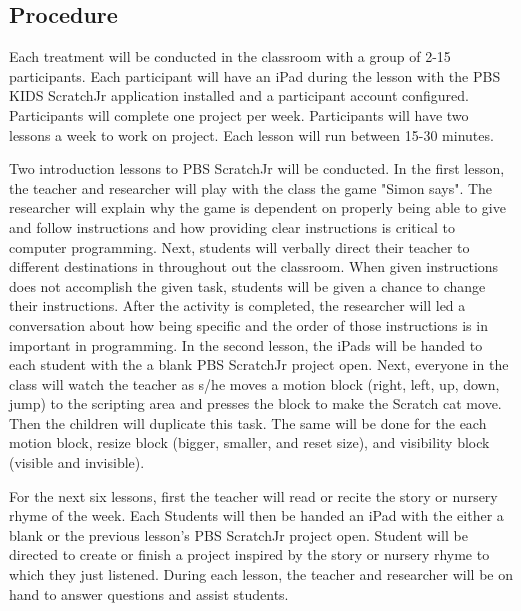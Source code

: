 \documentclass[11pt, letterpaper, onecolumn]{article}
\begin{document}
\subsection{Procedure}

Each treatment will be conducted in the classroom with a group of 2-15 participants. 
%
Each participant will have an iPad during the lesson with the PBS KIDS ScratchJr application installed and a participant account configured.
%
Participants will complete one project per week. 
%
Participants will have two lessons a week to work on project. 
%
Each lesson will run between 15-30 minutes. 

Two introduction lessons to PBS ScratchJr will be conducted. 
%
In the first lesson, the teacher and researcher will play with the class the game "Simon says".
%
The researcher will explain why the game is dependent on properly being able to give and follow instructions and how providing clear instructions is critical to computer programming. 
%
Next, students will verbally direct their teacher to different destinations in throughout out the classroom. 
%
When given instructions does not accomplish the given task, students will be given a chance to change their instructions. 
%
After the activity is completed, the researcher will led a conversation about how being specific and the order of those instructions is in important in programming.
%
In the second lesson, the iPads will be handed to each student with the a blank PBS ScratchJr project open. 
%
Next, everyone in the class will watch the teacher as s/he moves a motion block (right, left, up, down, jump) to the scripting area and presses the block to make the Scratch cat move. 
%
Then the children will duplicate this task. 
%
The same will be done for the each motion block, resize block (bigger, smaller, and reset size), and visibility block (visible and invisible).
%

%
For the next six lessons, first the teacher will read or recite the story or nursery rhyme of the week. 
%
Each Students will then be handed an iPad with the either a blank or the previous lesson's PBS ScratchJr project open. 
%
Student will be directed to create or finish a project inspired  by the story or nursery rhyme to which they just listened. 
%
During each lesson, the teacher and researcher will be on hand to answer questions and assist students. 
\end{document}
